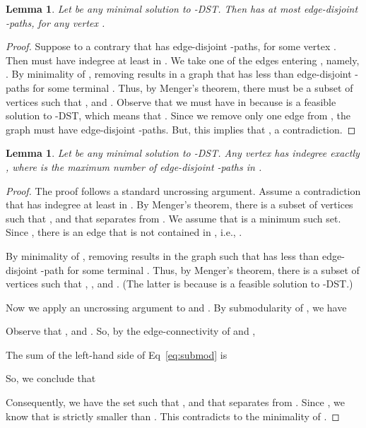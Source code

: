 \documentclass[11pt]{article}
\newtheorem{lemma}[theorem]{Lemma}
\theoremstyle{definition}
\theoremstyle{remark}
\begin{document}
\begin{lemma}
\label{lem:rv-paths-in-minimal-kDST}
Let  be any minimal solution to -DST.
Then  has at most  edge-disjoint -paths,
for any vertex .
\end{lemma}
\begin{proof}
Suppose to a contrary that  has  edge-disjoint -paths,
for some vertex .
Then  must have indegree at least  in .
We take one of the  edges entering , namely, .
By minimality of , removing  results in a graph 
 that has less than 
 edge-disjoint -paths for some terminal .
Thus, by Menger's theorem, 
there must be a subset of vertices 
such that ,  and 
. 
Observe that we must have  in  because
 is a feasible solution to -DST, 
which means that .
Since we remove only one edge  from , 
the graph  must have  edge-disjoint -paths. 
But, this implies that ,
a contradiction.
\end{proof}

\begin{lemma}
\label{lem:paths-eq-indeg}
Let  be any minimal solution to -DST.
Any vertex  has indegree exactly , 
where  is the maximum number of 
edge-disjoint -paths in .
\end{lemma}

\begin{proof}
The proof follows a standard uncrossing argument.
Assume a contradiction that 
 has indegree at least  in .
By Menger's theorem, there is a subset of 
vertices  such that 
,  and  
that separates  from .
We assume that  is a minimum such set. 
Since , there is an edge
 that is not contained in ,
i.e., . 

By minimality of , removing  results in 
the graph  such that  has less than
 edge-disjoint -path for some terminal .
Thus, by Menger's theorem, 
there is a subset of vertices 
such that , ,  
and .
(The latter is because  is a feasible solution to -DST.)

Now we apply an uncrossing argument to  and .
By submodularity of , we have

Observe that , 
and . 
So, by the edge-connectivity of  and ,  

The sum of the left-hand side of Eq~\eqref{eq:submod} is 

So, we conclude that 

Consequently, we have the set  such that 
,  and  that
separates  from .
Since , we know that  is strictly smaller than .
This contradicts to the minimality of .
\end{proof}
\end{document}
